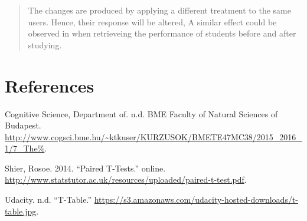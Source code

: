 \documentclass[]{article}
\begin{document}
\begin{quote}
The changes are produced by applying a different treatment to the same
users. Hence, their response will be altered, A similar effect could be
observed in when retrieveing the performance of students before and
after studying.
\end{quote}

\section*{References}\label{references}

\hypertarget{refs}{}
\hypertarget{ref-slides_t_test}{}
Cognitive Science, Department of. n.d. BME Faculty of Natural Sciences
of Budapest.
\url{http://www.cogsci.bme.hu/~ktkuser/KURZUSOK/BMETE47MC38/2015_2016_1/7_The\%}.

\hypertarget{ref-stanford_t_test}{}
Shier, Rosoe. 2014. ``Paired T-Tests.'' online.
\url{http://www.statstutor.ac.uk/resources/uploaded/paired-t-test.pdf}.

\hypertarget{ref-t-table}{}
Udacity. n.d. ``T-Table.''
\url{https://s3.amazonaws.com/udacity-hosted-downloads/t-table.jpg}.
\end{document}
